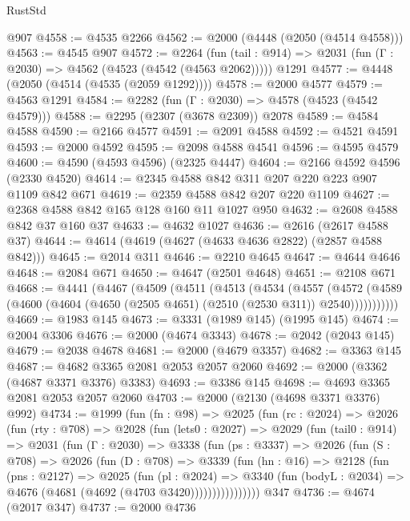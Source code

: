 \begin{lexlean}{RustStd}
\begin{coremodule}
    @907
@4558 := @4535 @2266
@4562 := @2000 (@4448 (@2050 (@4514 @4558)))
@4563 := @4545 @907
@4572 := @2264
    (fun (tail : @914) => @2031 (fun (Γ : @2030) => @4562 (@4523 (@4542 (@4563 @2062)))))
    @1291
@4577 := @4448 (@2050 (@4514 (@4535 (@2059 @1292))))
@4578 := @2000 @4577
@4579 := @4563 @1291
@4584 := @2282 (fun (Γ : @2030) => @4578 (@4523 (@4542 @4579)))
@4588 := @2295 (@2307 (@3678 @2309)) @2078
@4589 := @4584 @4588
@4590 := @2166 @4577
@4591 := @2091 @4588
@4592 := @4521 @4591
@4593 := @2000 @4592
@4595 := @2098 @4588 @4541
@4596 := @4595 @4579
@4600 := @4590 (@4593 @4596) (@2325 @4447)
@4604 := @2166 @4592 @4596 (@2330 @4520)
@4614 := @2345 @4588 @842 @311 @207 @220 @223 @907 @1109 @842 @671
@4619 := @2359 @4588 @842 @207 @220 @1109
@4627 := @2368 @4588 @842 @165 @128 @160 @11 @1027 @950
@4632 := @2608 @4588 @842 @37 @160 @37
@4633 := @4632 @1027
@4636 := @2616 (@2617 @4588 @37)
@4644 := @4614 (@4619 (@4627 (@4633 @4636 @2822) (@2857 @4588 @842)))
@4645 := @2014 @311
@4646 := @2210 @4645
@4647 := @4644 @4646
@4648 := @2084 @671
@4650 := @4647 (@2501 @4648)
@4651 := @2108 @671
@4668 := @4441
    (@4467
      (@4509
        (@4511
          (@4513
            (@4534
              (@4557
                (@4572
                  (@4589 (@4600 (@4604 (@4650 (@2505 @4651) (@2510 (@2530 @311)) @2540)))))))))))
@4669 := @1983 @145
@4673 := @3331 (@1989 @145) (@1995 @145)
@4674 := @2004 @3306
@4676 := @2000 (@4674 @3343)
@4678 := @2042 (@2043 @145)
@4679 := @2038 @4678
@4681 := @2000 (@4679 @3357)
@4682 := @3363 @145
@4687 := @4682 @3365 @2081 @2053 @2057 @2060
@4692 := @2000 (@3362 (@4687 @3371 @3376) @3383)
@4693 := @3386 @145
@4698 := @4693 @3365 @2081 @2053 @2057 @2060
@4703 := @2000 (@2130 (@4698 @3371 @3376) @992)
@4734 := @1999
    (fun (fn : @98) =>
    @2025
      (fun (rc : @2024) =>
      @2026
        (fun (rty : @708) =>
        @2028
          (fun (lets0 : @2027) =>
          @2029
            (fun (tail0 : @914) =>
            @2031
              (fun (Γ : @2030) =>
              @3338
                (fun (ps : @3337) =>
                @2026
                  (fun (S : @708) =>
                  @2026
                    (fun (D : @708) =>
                    @3339
                      (fun (hn : @16) =>
                      @2128
                        (fun (pns : @2127) =>
                        @2025
                          (fun (pl : @2024) =>
                          @3340
                            (fun (bodyL : @2034) => @4676 (@4681 (@4692 (@4703 @3420))))))))))))))))
    @347
@4736 := @4674 (@2017 @347)
@4737 := @2000 @4736

\end{coremodule}
\end{lexlean}
